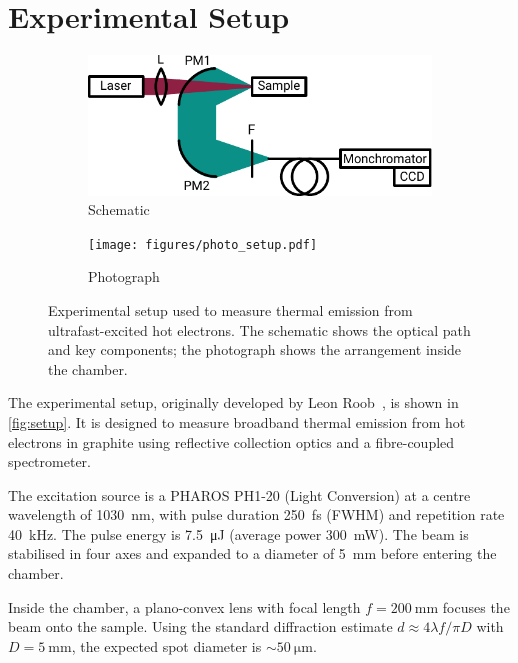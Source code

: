 \documentclass[
	parskip=half,
	a4paper,
]{scrarticle}
\begin{document}
\section{Experimental Setup}
\begin{figure}
    \centering
    \begin{subfigure}{3.5in}
        \centering
        \includegraphics{figures/setup.pdf}
        \caption{Schematic}
    \end{subfigure}\hfill
    \begin{subfigure}{2in}
        \centering
        \texttt{[image: figures/photo\_setup.pdf]}
        \caption{Photograph}
    \end{subfigure}
    \caption{Experimental setup used to measure thermal emission from ultrafast-excited hot electrons. The schematic shows the optical path and key components; the photograph shows the arrangement inside the chamber.}
    \label{fig:setup}
\end{figure}

The experimental setup, originally developed by Leon Roob~\cite{roob_thermal_2025}, is shown in \autoref{fig:setup}. It is designed to measure broadband thermal emission from hot electrons in graphite using reflective collection optics and a fibre-coupled spectrometer.

The excitation source is a PHAROS PH1-20 (Light Conversion) at a centre wavelength of \SI{1030}{\nano\metre}, with pulse duration \SI{250}{\femto\second} (FWHM) and repetition rate \SI{40}{\kilo\hertz}. The pulse energy is \SI{7.5}{\micro\joule} (average power \SI{300}{\milli\watt}). The beam is stabilised in four axes and expanded to a diameter of \SI{5}{\milli\metre} before entering the chamber.

Inside the chamber, a plano-convex lens with focal length \(f=\SI{200}{\milli\metre}\) focuses the beam onto the sample. Using the standard diffraction estimate \(d \approx 4\lambda f / \pi D\) with \(D=\SI{5}{\milli\metre}\), the expected spot diameter is \(\sim\SI{50}{\micro\metre}\).
\end{document}
